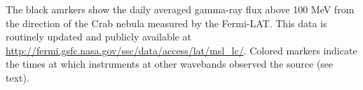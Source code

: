 The black amrkers show the daily averaged gamma-ray flux above 100 MeV from the direction of the Crab nebula measured by the Fermi-LAT. This data is routinely updated and publicly available at \url{http://fermi.gsfc.nasa.gov/ssc/data/access/lat/msl_lc/}. Colored markers indicate the times at which instruments at other wavebands observed the source (see text).\label{fig:lc}